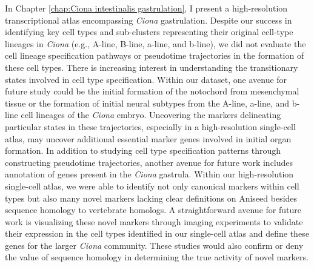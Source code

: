 \begin{dissertationepilogue}
    In Chapter \ref{chap:Ciona intestinalis gastrulation}, I present a high-resolution transcriptional atlas encompassing \textit{Ciona} gastrulation. Despite our success in identifying key cell types and sub-clusters representing their original cell-type lineages in \textit{Ciona} (e.g., A-line, B-line, a-line, and b-line), we did not evaluate the cell lineage specification pathways or pseudotime trajectories in the formation of these cell types. There is increasing interest in understanding the transitionary states involved in cell type specification. Within our dataset, one avenue for future study could be the initial formation of the notochord from mesenchymal tissue or the formation of initial neural subtypes from the A-line, a-line, and b-line cell lineages of the \textit{Ciona} embryo. Uncovering the markers delineating particular states in these trajectories, especially in a high-resolution single-cell atlas, may uncover additional essential marker genes involved in initial organ formation. In addition to studying cell type specification patterns through constructing pseudotime trajectories, another avenue for future work includes annotation of genes present in the \textit{Ciona} gastrula. Within our high-resolution single-cell atlas, we were able to identify not only canonical markers within cell types but also many novel markers lacking clear definitions on Aniseed besides sequence homology to vertebrate homologs. A straightforward avenue for future work is visualizing these novel markers through imaging experiments to validate their expression in the cell types identified in our single-cell atlas and define these genes for the larger \textit{Ciona} community. These studies would also confirm or deny the value of sequence homology in determining the true activity of novel markers.
    
\end{dissertationepilogue}